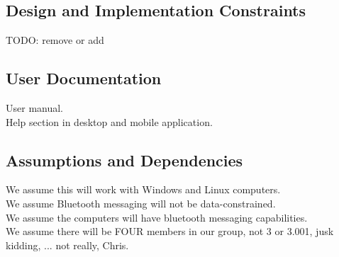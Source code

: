 \documentclass{article}
\begin{document}
\subsection{Design and Implementation Constraints}
TODO: remove or add

\subsection{User Documentation}
User manual.\\
Help section in desktop and mobile application.

\subsection{Assumptions and Dependencies}
We assume this will work with Windows and Linux computers.\\
We assume Bluetooth messaging will not be data-constrained.\\
We assume the computers will have bluetooth messaging capabilities.\\
We assume there will be FOUR members in our group, not 3 or 3.001, jusk kidding, ... not really, Chris.\\
\end{document}
